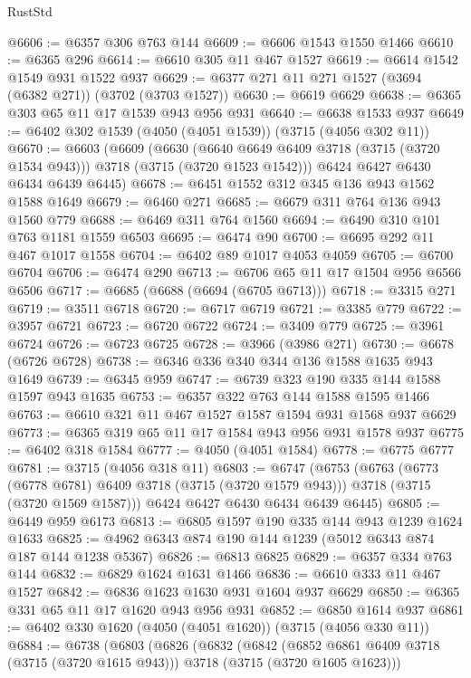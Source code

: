 \begin{lexlean}{RustStd}
\begin{coremodule}
@6606 := @6357 @306 @763 @144
@6609 := @6606 @1543 @1550 @1466
@6610 := @6365 @296
@6614 := @6610 @305 @11 @467 @1527
@6619 := @6614 @1542 @1549 @931 @1522 @937
@6629 := @6377 @271 @11 @271 @1527 (@3694 (@6382 @271)) (@3702 (@3703 @1527))
@6630 := @6619 @6629
@6638 := @6365 @303 @65 @11 @17 @1539 @943 @956 @931
@6640 := @6638 @1533 @937
@6649 := @6402 @302 @1539 (@4050 (@4051 @1539)) (@3715 (@4056 @302 @11))
@6670 := @6603
    (@6609
      (@6630 (@6640 @6649 @6409 @3718 (@3715 (@3720 @1534 @943))) @3718 (@3715 (@3720 @1523 @1542)))
      @6424
      @6427
      @6430
      @6434
      @6439
      @6445)
@6678 := @6451 @1552 @312 @345 @136 @943 @1562 @1588 @1649
@6679 := @6460 @271
@6685 := @6679 @311 @764 @136 @943 @1560 @779
@6688 := @6469 @311 @764 @1560
@6694 := @6490 @310 @101 @763 @1181 @1559 @6503
@6695 := @6474 @90
@6700 := @6695 @292 @11 @467 @1017 @1558
@6704 := @6402 @89 @1017 @4053 @4059
@6705 := @6700 @6704
@6706 := @6474 @290
@6713 := @6706 @65 @11 @17 @1504 @956 @6566 @6506
@6717 := @6685 (@6688 (@6694 (@6705 @6713)))
@6718 := @3315 @271
@6719 := @3511 @6718
@6720 := @6717 @6719
@6721 := @3385 @779
@6722 := @3957 @6721
@6723 := @6720 @6722
@6724 := @3409 @779
@6725 := @3961 @6724
@6726 := @6723 @6725
@6728 := @3966 (@3986 @271)
@6730 := @6678 (@6726 @6728)
@6738 := @6346 @336 @340 @344 @136 @1588 @1635 @943 @1649
@6739 := @6345 @959
@6747 := @6739 @323 @190 @335 @144 @1588 @1597 @943 @1635
@6753 := @6357 @322 @763 @144 @1588 @1595 @1466
@6763 := @6610 @321 @11 @467 @1527 @1587 @1594 @931 @1568 @937 @6629
@6773 := @6365 @319 @65 @11 @17 @1584 @943 @956 @931 @1578 @937
@6775 := @6402 @318 @1584
@6777 := @4050 (@4051 @1584)
@6778 := @6775 @6777
@6781 := @3715 (@4056 @318 @11)
@6803 := @6747
    (@6753
      (@6763
        (@6773 (@6778 @6781) @6409 @3718 (@3715 (@3720 @1579 @943)))
        @3718
        (@3715 (@3720 @1569 @1587)))
      @6424
      @6427
      @6430
      @6434
      @6439
      @6445)
@6805 := @6449 @959 @6173
@6813 := @6805 @1597 @190 @335 @144 @943 @1239 @1624 @1633
@6825 := @4962 @6343 @874 @190 @144 @1239 (@5012 @6343 @874 @187 @144 @1238 @5367)
@6826 := @6813 @6825
@6829 := @6357 @334 @763 @144
@6832 := @6829 @1624 @1631 @1466
@6836 := @6610 @333 @11 @467 @1527
@6842 := @6836 @1623 @1630 @931 @1604 @937 @6629
@6850 := @6365 @331 @65 @11 @17 @1620 @943 @956 @931
@6852 := @6850 @1614 @937
@6861 := @6402 @330 @1620 (@4050 (@4051 @1620)) (@3715 (@4056 @330 @11))
@6884 := @6738
    (@6803
      (@6826
        (@6832
          (@6842
            (@6852 @6861 @6409 @3718 (@3715 (@3720 @1615 @943)))
            @3718
            (@3715 (@3720 @1605 @1623)))

\end{coremodule}
\end{lexlean}
